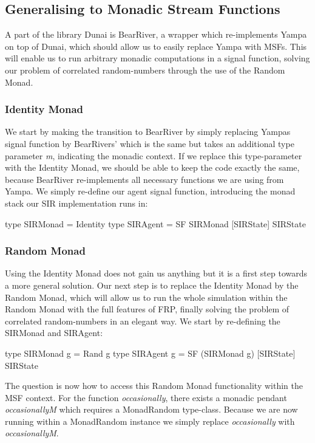 \subsection{Generalising to Monadic Stream Functions}
\label{sec:generalising_msfs}
A part of the library Dunai is BearRiver, a wrapper which re-implements Yampa on top of Dunai, which should allow us to easily replace Yampa with MSFs. This will enable us to run arbitrary monadic computations in a signal function, solving our problem of correlated random-numbers through the use of the Random Monad.

\subsubsection{Identity Monad}
We start by making the transition to BearRiver by simply replacing Yampas signal function by BearRivers' which is the same but takes an additional type parameter \textit{m}, indicating the monadic context. If we replace this type-parameter with the Identity Monad, we should be able to keep the code exactly the same, because BearRiver re-implements all necessary functions we are using from Yampa. We simply re-define our agent signal function, introducing the monad stack our SIR implementation runs in:

\begin{HaskellCode}
type SIRMonad    = Identity
type SIRAgent    = SF SIRMonad [SIRState] SIRState
\end{HaskellCode}

\subsubsection{Random Monad}
Using the Identity Monad does not gain us anything but it is a first step towards a more general solution. Our next step is to replace the Identity Monad by the Random Monad, which will allow us to run the whole simulation within the Random Monad with the full features of FRP, finally solving the problem of correlated random-numbers in an elegant way. We start by re-defining the SIRMonad and SIRAgent:

\begin{HaskellCode}
type SIRMonad g = Rand g
type SIRAgent g = SF (SIRMonad g) [SIRState] SIRState
\end{HaskellCode}

The question is now how to access this Random Monad functionality within the MSF context. For the function \textit{occasionally}, there exists a monadic pendant \textit{occasionallyM} which requires a MonadRandom type-class. Because we are now running within a MonadRandom instance we simply replace \textit{occasionally} with \textit{occasionallyM}. 

